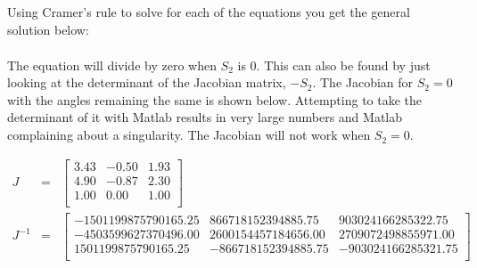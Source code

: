 \begin{homeworkProblem}
Using Cramer's rule to solve for each of the equations you get the general solution below:
\begin{eqnarray}

\end{eqnarray}

The equation will divide by zero when $S_2$ is 0. This can also be found by just looking at the determinant of the Jacobian matrix, $-S_2$. The Jacobian for $S_2=0$ with the angles remaining the same is shown below. Attempting to take the determinant of it with Matlab results in very large numbers and Matlab complaining about a singularity. The Jacobian will not work when $S_2=0$.

\begin{eqnarray}
J&=&\begin{bmatrix}
3.43&-0.50&1.93\\ 
4.90&-0.87&2.30\\ 
1.00&0.00&1.00\\ 
\end{bmatrix} \\
J^{-1}&=&\begin{bmatrix}
-1501199875790165.25&866718152394885.75&903024166285322.75\\ 
-4503599627370496.00&2600154457184656.00&2709072498855971.00\\ 
1501199875790165.25&-866718152394885.75&-903024166285321.75\\ 
\end{bmatrix}
\end{eqnarray}
\end{homeworkProblem}